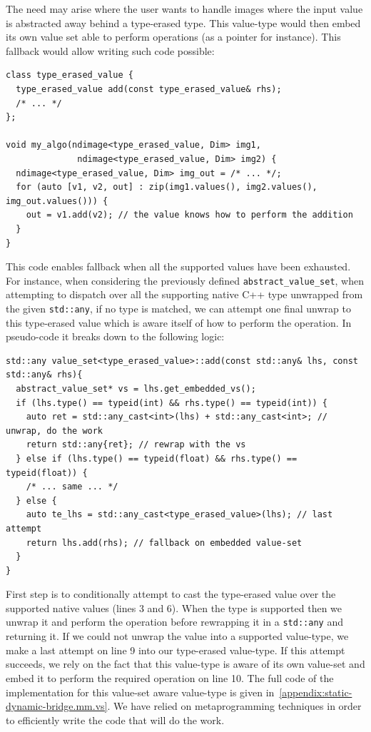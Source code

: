 The need may arise where the user wants to handle images where the input value is abstracted away behind a type-erased
type. This value-type would then embed its own value set able to perform operations (as a pointer for instance). This
fallback would allow writing such code possible:
\begin{verbatim}
class type_erased_value {
  type_erased_value add(const type_erased_value& rhs);
  /* ... */
};

void my_algo(ndimage<type_erased_value, Dim> img1,
              ndimage<type_erased_value, Dim> img2) {
  ndimage<type_erased_value, Dim> img_out = /* ... */;
  for (auto [v1, v2, out] : zip(img1.values(), img2.values(), img_out.values())) {
    out = v1.add(v2); // the value knows how to perform the addition
  }
}
\end{verbatim}

This code enables fallback when all the supported values have been exhausted. For instance, when considering the
previously defined \texttt{abstract\_value\_set}, when attempting to dispatch over all the supporting native C++ type
unwrapped from the given \texttt{std::any}, if no type is matched, we can attempt one final unwrap to this type-erased
value which is aware itself of how to perform the operation. In pseudo-code it breaks down to the following logic:
\begin{verbatim}
std::any value_set<type_erased_value>::add(const std::any& lhs, const std::any& rhs){
  abstract_value_set* vs = lhs.get_embedded_vs();
  if (lhs.type() == typeid(int) && rhs.type() == typeid(int)) {
    auto ret = std::any_cast<int>(lhs) + std::any_cast<int>; // unwrap, do the work
    return std::any{ret}; // rewrap with the vs
  } else if (lhs.type() == typeid(float) && rhs.type() == typeid(float)) {
    /* ... same ... */
  } else {
    auto te_lhs = std::any_cast<type_erased_value>(lhs); // last attempt
    return lhs.add(rhs); // fallback on embedded value-set
  }
}
\end{verbatim}
First step is to conditionally attempt to cast the type-erased value over the supported native values (lines 3 and 6).
When the type is supported then we unwrap it and perform the operation before rewrapping it in a \texttt{std::any} and
returning it. If we could not unwrap the value into a supported value-type, we make a last attempt on line 9 into our
type-erased value-type. If this attempt succeeds, we rely on the fact that this value-type is aware of its own value-set
and embed it to perform the required operation on line 10. The full code of the implementation for this value-set aware value-type is given
in~\cref{appendix:static-dynamic-bridge.mm.vs}. We have relied on metaprogramming techniques in order to efficiently
write the code that will do the work.

